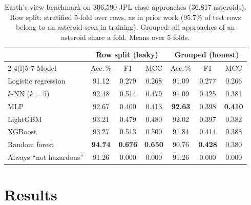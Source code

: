 \documentclass[make,article,submit,moreauthors]{Definitions/mdpi}
\begin{document}
\begin{table}[t]
\centering
\footnotesize
\caption{Earth's-view benchmark on 306,590 JPL close approaches (36,817 asteroids). Row split: stratified 5-fold over rows, as in prior work (95.7\% of test rows belong to an asteroid seen in training). Grouped: all approaches of an asteroid share a fold. Means over 5 folds.}
\label{tab:earthview}
\setlength{\tabcolsep}{2.4pt}
\begin{tabular}{@{}lcccccc@{}}
\toprule
 & \multicolumn{3}{c}{Row split (leaky)} & \multicolumn{3}{c}{Grouped (honest)} \\
\cmidrule(lr){2-4}\cmidrule(l){5-7}
Model & Acc.\,\% & F1 & MCC & Acc.\,\% & F1 & MCC \\
\midrule
Logistic regression & 91.12 & 0.279 & 0.268 & 91.09 & 0.277 & 0.266 \\
$k$-NN ($k{=}5$) & 92.48 & 0.514 & 0.479 & 91.09 & 0.425 & 0.381 \\
MLP & 92.67 & 0.400 & 0.413 & \textbf{92.63} & 0.398 & \textbf{0.410} \\
LightGBM & 93.21 & 0.479 & 0.480 & 92.02 & 0.397 & 0.382 \\
XGBoost & 93.27 & 0.513 & 0.500 & 91.84 & 0.414 & 0.388 \\
Random forest & \textbf{94.74} & \textbf{0.676} & \textbf{0.650} & 90.76 & \textbf{0.428} & 0.380 \\
\midrule
Always ``not hazardous'' & 91.26 & 0.000 & 0.000 & 91.26 & 0.000 & 0.000 \\
\bottomrule
\end{tabular}
\end{table}


\section{Results}
\end{document}
